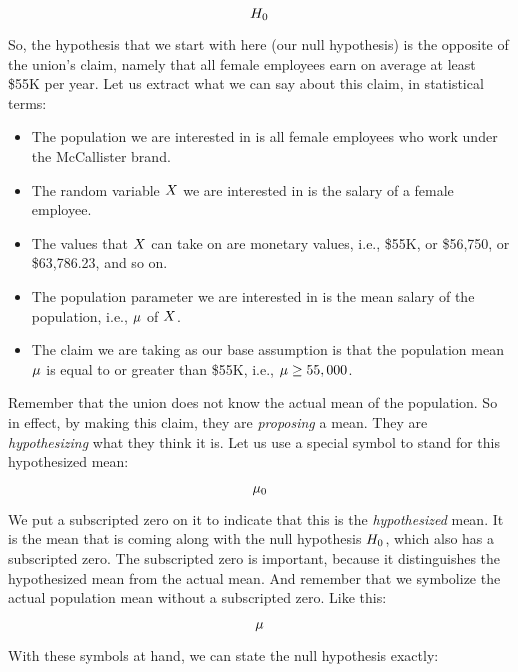 \documentclass[../../../main.tex]{subfiles}
\begin{document}
\begin{equation*}
  \NullHyp/
\end{equation*}

\noindent
So, the hypothesis that we start with here (our null hypothesis) is the opposite of the union's claim, namely that all female employees earn on average at least \$55K per year. Let us extract what we can say about this claim, in statistical terms:

\begin{itemize}
  \item The population we are interested in is all female employees who work under the McCallister brand.
  \item The random variable $\RandVar/$ we are interested in is the salary of a female employee.
  \item The values that $\RandVar/$ can take on are monetary values, i.e., \$55K, or \$56,750, or \$63,786.23, and so on.
  \item The population parameter we are interested in is the mean salary of the population, i.e., $\mu$ of $\RandVar/$.
  \item The claim we are taking as our base assumption is that the population mean $\mu$ is equal to or greater than \$55K, i.e., $\mu \geq 55,000$.
\end{itemize}

\noindent
Remember that the union does not know the actual mean of the population. So in effect, by making this claim, they are \emph{proposing} a mean. They are \emph{hypothesizing} what they think it is. Let us use a special symbol to stand for this hypothesized mean:

\begin{equation*}
  \HypPopMean/
\end{equation*}

\noindent
We put a subscripted zero on it to indicate that this is the \emph{hypothesized} mean. It is the mean that is coming along with the null hypothesis $\NullHyp/$, which also has a subscripted zero. The subscripted zero is important, because it distinguishes the hypothesized mean from the actual mean. And remember that we symbolize the actual population mean without a subscripted zero. Like this:

\begin{equation*}
  \mu
\end{equation*}

\noindent
With these symbols at hand, we can state the null hypothesis exactly:
\end{document}
